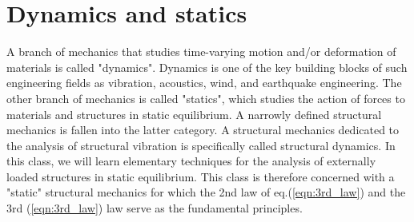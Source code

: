 \documentclass[10pt,a4j]{article}
\begin{document}
\section{Dynamics and statics}
A branch of mechanics that studies time-varying motion and/or deformation of materials is called "dynamics". Dynamics is one of the key building blocks of such engineering fields as vibration, acoustics, wind, and earthquake engineering. The other branch of mechanics is called "statics", which studies the action of forces to materials and structures in static equilibrium. A narrowly defined structural mechanics is fallen into the latter category. A structural mechanics dedicated to the analysis of structural vibration is specifically called structural dynamics. In this class, we will learn elementary techniques for the analysis of externally loaded structures in static equilibrium. This class is therefore concerned with a "static" structural mechanics for which the 2nd law of eq.(\ref{eqn:3rd_law}) and the 3rd (\ref{eqn:3rd_law}) law serve as the fundamental principles. 
\end{document}
